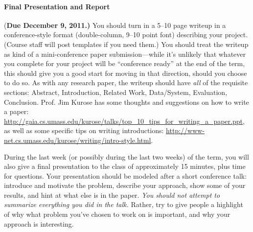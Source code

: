 \documentclass[11pt]{article}
\begin{document}
\paragraph{Final Presentation and Report} 
({\bf Due December 9, 2011.)} You should turn in a 5--10 page writeup in
a conference-style format (\eg double-column, 9--10 point font)
describing your project.  (Course staff will post templates if you need
them.)  You should treat the writeup as kind of a mini-conference paper
submission---while it's unlikely that whatever you complete for your
project will be ``conference ready'' at the end of the term, this should
give you a good start for moving in that direction, should you choose to
do so.  As with any research paper, the writeup should have {\em all} of
the requisite sections: Abstract, Introduction, Related Work,
Data/System, Evaluation, Conclusion.  Prof. Jim Kurose has some thoughts
and suggestions on how to write a paper:
\url{http://gaia.cs.umass.edu/kurose/talks/top_10_tips_for_writing_a_paper.ppt},
as well as some specific tips on writing introductions:
\url{http://www-net.cs.umass.edu/kurose/writing/intro-style.html}.


During the last week (or possibly during the last two weeks) of the
term, you will also give a final presentation to the class of
approximately 15 minutes, plus time for questions.  Your presentation
should be modeled after a short conference talk: introduce and motivate
the problem, describe your approach, show some of your results, and hint
at what else is in the paper.  {\em You should not attempt to summarize
  everything you did in the talk.}  Rather, try to give people a
highlight of why what problem you've chosen to work on is important, and
why your approach is interesting.
\end{document}
